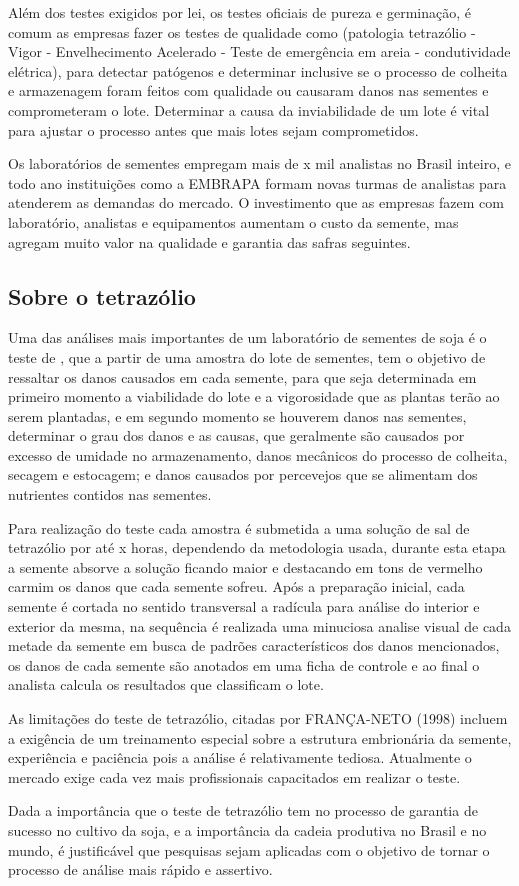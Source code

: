 Além dos testes exigidos por lei, os testes oficiais de pureza e germinação, é comum as empresas fazer os testes de qualidade como (patologia  tetrazólio - Vigor - Envelhecimento Acelerado - Teste de emergência em areia - condutividade elétrica), para detectar patógenos e determinar inclusive se o processo de colheita e armazenagem foram feitos com qualidade ou causaram danos nas sementes e comprometeram o lote. Determinar a causa da inviabilidade de um lote é vital para ajustar o processo antes que mais lotes sejam comprometidos.

Os laboratórios de sementes empregam mais de x mil analistas no Brasil inteiro, e todo ano instituições como a EMBRAPA formam novas turmas de analistas para atenderem as demandas do mercado. O investimento que as empresas fazem com laboratório, analistas e equipamentos aumentam o custo da semente, mas agregam muito valor na qualidade e garantia das safras seguintes.

\subsection{Sobre o tetrazólio}
Uma das análises mais importantes de um laboratório de sementes de soja é o teste de , que a partir de uma amostra do lote de sementes, tem o objetivo de ressaltar os danos causados em cada semente, para que seja determinada em primeiro momento a viabilidade do lote e a vigorosidade que as plantas terão ao serem plantadas, e em segundo momento se houverem danos nas sementes, determinar o grau dos danos e as causas, que geralmente são causados por excesso de umidade no armazenamento, danos mecânicos do processo de colheita, secagem e estocagem; e danos causados por percevejos que se alimentam dos nutrientes contidos nas sementes.

Para realização do teste cada amostra é submetida a uma solução de sal de tetrazólio por até x horas, dependendo da metodologia usada, durante esta etapa a semente absorve a solução ficando maior e destacando em tons de vermelho carmim os danos que cada semente sofreu. Após a preparação inicial, cada semente é cortada no sentido transversal a radícula para análise do interior e exterior da mesma, na sequência é realizada uma minuciosa analise visual de cada metade da semente em busca de padrões característicos dos danos mencionados, os danos de cada semente são anotados em uma ficha de controle e ao final o analista calcula os resultados que classificam o lote.

As limitações do teste de tetrazólio, citadas por FRANÇA-NETO (1998) incluem a exigência de um treinamento especial sobre a estrutura embrionária da semente, experiência e paciência pois a análise é relativamente tediosa. Atualmente o mercado exige cada vez mais profissionais capacitados em realizar o teste.


Dada a importância que o teste de tetrazólio tem no processo de garantia de sucesso no cultivo da soja, e a importância da cadeia produtiva no Brasil e no mundo, é justificável que pesquisas sejam aplicadas com o objetivo de tornar o processo de análise mais rápido e assertivo.


